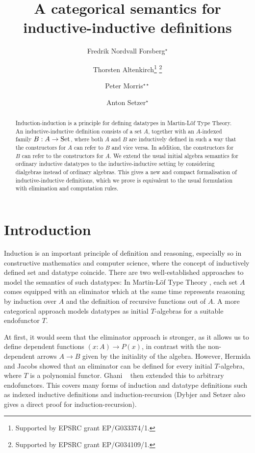 \documentclass[orivec,envcountsame, ,envcountsect]{llncs}
\title{A categorical semantics for inductive-inductive definitions}
\author{Fredrik Nordvall Forsberg\inst{1}$^{\star}$
\and Thorsten Altenkirch\inst{2}\thanks{Supported by EPSRC grant EP/G033374/1.}\fnmsep
                                \thanks{Supported by EPSRC grant EP/G034109/1.}
\and Peter Morris\inst{2}$^{\star\star}$ %
\and Anton Setzer\inst{1}$^{\star}$}
\institute{Department of Computer Science, Swansea University
      \and School of Computer Science, University of Nottingham}
\begin{document}
\maketitle

\begin{abstract}
  Induction-induction is a principle for defining datatypes in
  Martin-L\"of Type Theory. An inductive-inductive definition consists
  of a set $A$, together with an $A$-indexed family $B : A \to \text{Set}$,
  where both $A$ and $B$ are inductively defined in such a way that
  the constructors for $A$ can refer to $B$ and vice versa. In
  addition, the constructors for $B$ can refer to the constructors for
  $A$.
%
  We extend the usual initial algebra semantics for ordinary
  inductive datatypes to the inductive-inductive setting by
  considering dialgebras instead of ordinary algebras. This gives a
  new and compact formalisation of inductive-inductive definitions,
  which we prove is equivalent to the usual formulation with
  elimination and computation rules.
\end{abstract}

\section{Introduction}

Induction is an important principle of definition and reasoning,
especially so in constructive mathematics and computer science, where
the concept of inductively defined set and datatype coincide. There
are two well-established approaches to model the semantics of such
datatypes: In Martin-L\"of Type Theory
\cite{martinlof1984bibliopolis}, each set $A$ comes equipped with an
eliminator which at the same time represents reasoning by induction
over $A$ and the definition of recursive functions out of $A$.  A more
categorical approach %
models datatypes as initial $T$-algebras for a suitable endofunctor
$T$.

At first, it would seem that the eliminator approach is stronger, as
it allows us to define dependent functions $(x : A) \to P(x)$, in
contrast with the non-dependent arrows $A \to B$ given by the
initiality of the algebra. However, Hermida and Jacobs
\cite{hermidaJacobs1998initInduction} showed that an eliminator can be
defined for every initial $T$-algebra, where $T$ is a polynomial
functor.  Ghani \etal\ \cite{ghaniJohannFumex2010fibind} then extended
this to arbitrary endofunctors.  This covers many forms of induction
and datatype definitions such as indexed inductive definitions
\cite{dybjer1994indfam} and induction-recursion
\cite{dybjersetzer1999finax} (Dybjer and Setzer
\cite{dybjersetzer2003inalg} also gives a direct proof for
induction-recursion).
\end{document}
